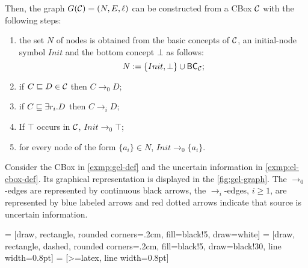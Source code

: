 Then, the graph $G(\mathcal{C}) = (N, E, \ell)$ can be constructed from a CBox $\mathcal{C}$ with the following steps:
\begin{enumerate}
	\item the set $N$ of nodes is obtained from the basic concepts of $\mathcal{C}$, an initial-node symbol $Init$ and the bottom concept $\bot$ %
	as follows:
		  \[ N := \{Init, \bot\} \cup \textsf{BC}_{\mathcal{C}} 
		  ; 
		  \]
	\item if $C \sqsubseteq D \in \mathcal{C}$ then $C \to_0 D$;
	\item if $C \sqsubseteq \exists r_i.D$ then $C \to_i D$;
	\item If $\top$ occurs in $\mathcal{C}$, $Init \to_0 \top$;
	\item for every node of the form $\{a_i\} \in N$, $Init \to_0 \{a_i\}$.
\end{enumerate}

\begin{example}
	Consider the CBox in \cref{exmp:gel-def} and the uncertain information in \cref{exmp:el-cbox-def}. Its graphical representation is displayed in the \cref{fig:gel-graph}. The $\to_0$-edges are represented by continuous black arrows, the $\to_i$-edges, $i \geq 1$, are represented by blue labeled arrows and red dotted arrows indicate that source is uncertain information.
\end{example}

 = [draw, rectangle, rounded corners=.2cm, fill=black!5, draw=white]
 = [draw, rectangle, dashed, rounded corners=.2cm, fill=black!5, draw=black!30, line width=0.8pt]
 = [>=latex, line width=0.8pt]

